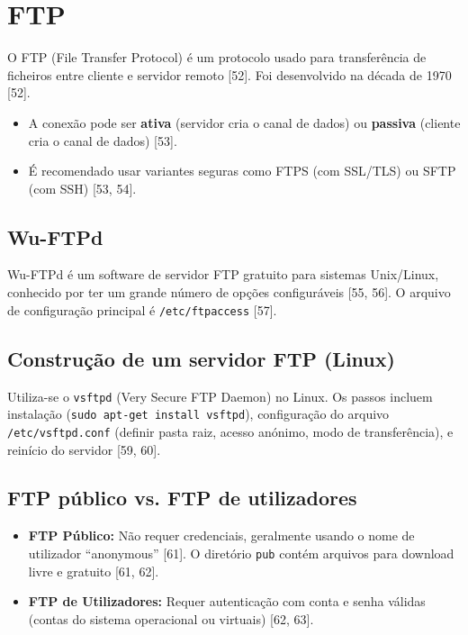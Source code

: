 \documentclass[12pt, a4paper]{article}
\begin{document}
	\newpage
	
	\section{FTP} %
	O FTP (File Transfer Protocol) é um protocolo usado para transferência de ficheiros entre cliente e servidor remoto [52]. Foi desenvolvido na década de 1970 [52].
	\begin{itemize}
		\item A conexão pode ser \textbf{ativa} (servidor cria o canal de dados) ou \textbf{passiva} (cliente cria o canal de dados) [53].
		\item É recomendado usar variantes seguras como FTPS (com SSL/TLS) ou SFTP (com SSH) [53, 54].
	\end{itemize}
	
	\subsection{Wu-FTPd} %
	Wu-FTPd é um software de servidor FTP gratuito para sistemas Unix/Linux, conhecido por ter um grande número de opções configuráveis [55, 56]. O arquivo de configuração principal é \texttt{/etc/ftpaccess} [57].
	
	\subsection{Construção de um servidor FTP (Linux)} %
	Utiliza-se o \texttt{vsftpd} (Very Secure FTP Daemon) no Linux. Os passos incluem instalação (\texttt{sudo apt-get install vsftpd}), configuração do arquivo \texttt{/etc/vsftpd.conf} (definir pasta raiz, acesso anónimo, modo de transferência), e reinício do servidor [59, 60].
	
	\subsection{FTP público vs. FTP de utilizadores} %
	\begin{itemize}
		\item \textbf{FTP Público:} Não requer credenciais, geralmente usando o nome de utilizador “anonymous” [61]. O diretório \texttt{pub} contém arquivos para download livre e gratuito [61, 62].
		\item \textbf{FTP de Utilizadores:} Requer autenticação com conta e senha válidas (contas do sistema operacional ou virtuais) [62, 63].
	\end{itemize}
	
\end{document}
